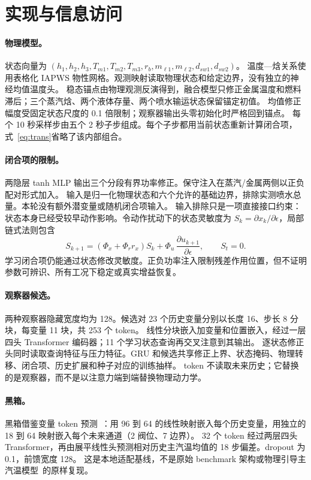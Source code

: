 \section{实现与信息访问}\label{app:implementation}

\paragraph{物理模型。}
状态向量为 $(h_1,h_2,h_3,T_{m1},T_{m2},T_{m3},r_b,m_{\ell1},m_{\ell2},d_{sw1},d_{sw2})$。
温度—焓关系使用表格化 IAPWS 物性网格。观测映射读取物理状态和给定边界，没有独立的神经均值温度头。
稳态锚点由物理观测反演得到，融合模型只修正金属温度和燃料滞后；三个蒸汽焓、两个液体存量、两个喷水输运状态保留锚定初值。
均值修正幅度受固定状态尺度的 0.1 倍限制；观察器输出头零初始化时严格回到锚点。
每个 10 秒采样步由五个 2 秒子步组成。每个子步都用当前状态重新计算闭合项，式~\ref{eq:trans}省略了该内部组合。

\paragraph{闭合项的限制。}
两隐层 tanh MLP 输出三个分段有界功率修正。保守注入在蒸汽/金属两侧以正负配对形式加入。
输入是归一化物理状态和六个允许的基础边界，排除实测喷水总量。本轮没有额外潜变量或随机闭合项输入。
输入排除只是一项直接接口约束：状态本身已经受较早动作影响。令动作扰动下的状态灵敏度为 $S_k=\partial x_k/\partial\epsilon$，局部链式法则包含
\[
S_{k+1}=(\Phi_x+\Phi_r r_x)S_k+\Phi_u\,
\frac{\partial u_{k+1}}{\partial\epsilon},\qquad S_t=0.
\]
学习闭合项仍能通过状态修改灵敏度。正负功率注入限制残差作用位置，但不证明参数可辨识、所有工况下稳定或真实增益恢复。

\paragraph{观察器候选。}
两种观察器隐藏宽度均为 128。候选对 23 个历史变量分别以长度 16、步长 8 分块，每变量 11 块，共 253 个 token。
线性分块嵌入加变量和位置嵌入，经过一层四头 Transformer 编码器；11 个学习状态查询再交叉注意到其输出。
逐状态修正头同时读取查询特征与压力特征。GRU 和候选共享修正上界、状态掩码、物理转移、闭合项、历史扩展和种子对应的训练抽样。
token 不读取未来历史；它替换的是观察器，而不是以注意力端到端替换物理动力学。

\paragraph{黑箱。}
黑箱借鉴变量 token 预测~\cite{liu2024itransformer}：用 96 到 64 的线性映射嵌入每个历史变量，用独立的 18 到 64 映射嵌入每个未来通道（2 阀位、7 边界）。
32 个 token 经过两层四头 Transformer，再由展平线性头预测相对历史主汽温均值的 18 步偏差。dropout 为 0.1，前馈宽度 128。
这是本地适配基线，不是原始 benchmark 架构或物理引导主汽温模型~\cite{zhang2026sst}的原样复现。

